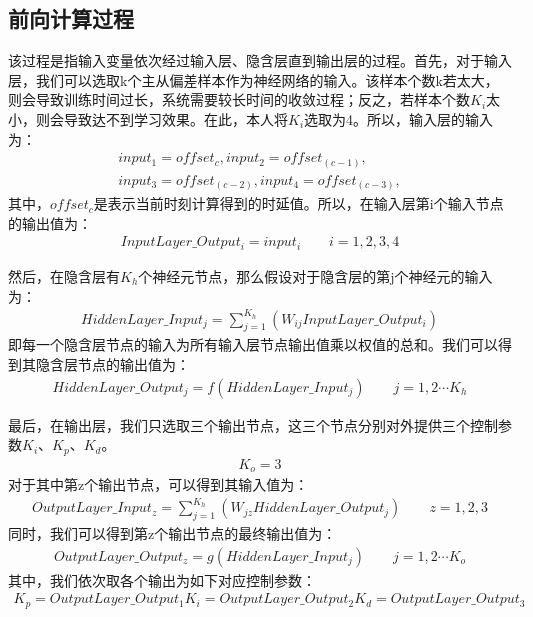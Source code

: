 \subsection{前向计算过程}
该过程是指输入变量依次经过输入层、隐含层直到输出层的过程。首先，对于输入层，我们可以选取k个主从偏差样本作为神经网络的输入。该样本个数k若太大，则会导致训练时间过长，系统需要较长时间的收敛过程；反之，若样本个数$K_{i}$太小，则会导致达不到学习效果\supercite{69}。在此，本人将$K_{i}$选取为4。所以，输入层的输入为：
\begin{align}
	input_{1} = offset_{c}, input_{2} = offset_{(c-1)}, \\
	input_{3} = offset_{(c-2)}, input_{4} = offset_{(c-3)}, 
\end{align}
其中，$offset_{c}$是表示当前时刻计算得到的时延值。所以，在输入层第i个输入节点的输出值为：
\begin{align}
	InputLayer\_Output_{i} = input_{i} \qquad i = 1, 2, 3, 4
\end{align}

然后，在隐含层有$K_{h}$个神经元节点，那么假设对于隐含层的第j个神经元的输入为：
\begin{align}
	HiddenLayer\_Input_{j} = \sum_{j=1}^{K_{h}}(W_{ij}InputLayer\_Output_{i})
\end{align}
即每一个隐含层节点的输入为所有输入层节点输出值乘以权值的总和。我们可以得到其隐含层节点的输出值为：
\begin{align}
	HiddenLayer\_Output_{j} = f(HiddenLayer\_Input_{j}) \qquad j = 1, 2 \cdots K_{h}
\end{align}

最后，在输出层，我们只选取三个输出节点，这三个节点分别对外提供三个控制参数$K_{i}$、$K_{p}$、$K_{d}$。
\begin{align}
K_{o} = 3
\end{align}
对于其中第z个输出节点，可以得到其输入值为：
\begin{align}
OutputLayer\_Input_{z} = \sum_{j=1}^{K_{h}}(W_{jz}HiddenLayer\_Output_{j}) \qquad z = 1, 2, 3
\end{align}
同时，我们可以得到第z个输出节点的最终输出值为：
\begin{align}
OutputLayer\_Output_{z} = g(HiddenLayer\_Input_{j}) \qquad j = 1, 2 \cdots K_{o}
\end{align}
其中，我们依次取各个输出为如下对应控制参数：
\begin{align}
K_{p} = OutputLayer\_Output_{1}
K_{i} = OutputLayer\_Output_{2}
K_{d} = OutputLayer\_Output_{3}
\end{align}

